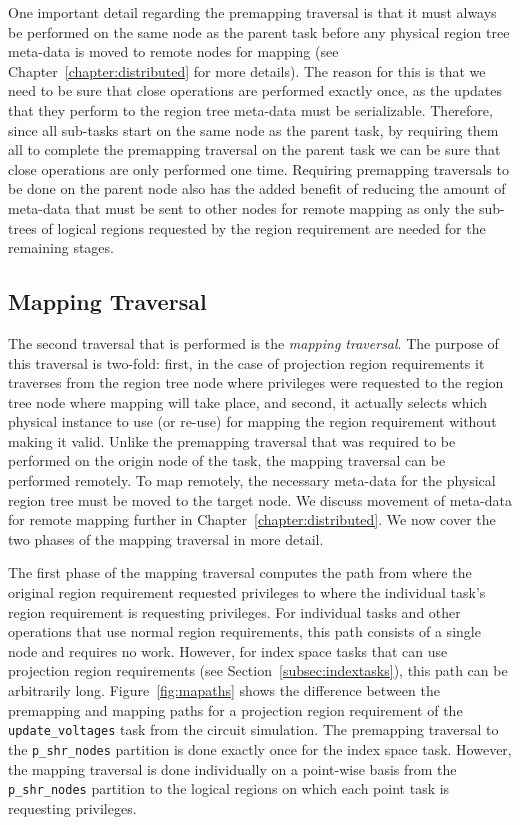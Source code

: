One important detail regarding the premapping
traversal is that it must always be performed
on the same node as the parent task before any
physical region tree meta-data is moved to
remote nodes for mapping (see 
Chapter~\ref{chapter:distributed} for more
details).  The reason for this is that we
need to be sure that close operations are
performed exactly once, as the updates that
they perform to the region tree meta-data
must be serializable. Therefore, since all
sub-tasks start on the same node as the 
parent task, by requiring them all to complete
the premapping traversal on the parent task
we can be sure that close operations are
only performed one time. Requiring premapping
traversals to be done on the parent node
also has the added benefit of reducing the 
amount of meta-data that must be sent to
other nodes for remote mapping as only 
the sub-trees of logical regions requested
by the region requirement are needed for
the remaining stages.

\subsection{Mapping Traversal}
\label{subsec:maptraversal}
The second traversal that is performed is
the {\em mapping traversal}.  The purpose
of this traversal is two-fold: first, in
the case of projection region requirements
it traverses from the region tree node  where
privileges were requested to the region tree
node where mapping will take place, and 
second, it actually selects which physical
instance to use (or re-use) for mapping the
region requirement without making it valid. 
Unlike the premapping traversal
that was required to be performed on the
origin node of the task, the mapping
traversal can be performed remotely. To
map remotely, the necessary meta-data for
the physical region tree must be moved
to the target node.  We discuss movement
of meta-data for remote mapping further
in Chapter~\ref{chapter:distributed}. We
now cover the two phases of the mapping
traversal in more detail.

The first phase of the mapping traversal
computes the path from where the original
region requirement requested privileges
to where the individual task's region
requirement is requesting privileges. For
individual tasks and other operations
that use normal region requirements, this
path consists of a single node and requires
no work.  However, for index space tasks
that can use projection region requirements
(see Section~\ref{subsec:indextasks}), this
path can be arbitrarily long. 
Figure~\ref{fig:mapaths} shows the difference
between the premapping and mapping paths for
a projection region requirement of the 
{\tt update\_voltages} task from the circuit
simulation. The premapping traversal to the
{\tt p\_shr\_nodes} partition is done exactly 
once for the index space task. However, the 
mapping traversal is done individually on 
a point-wise basis from the {\tt p\_shr\_nodes}
partition to the logical regions on which
each point task is requesting privileges.

